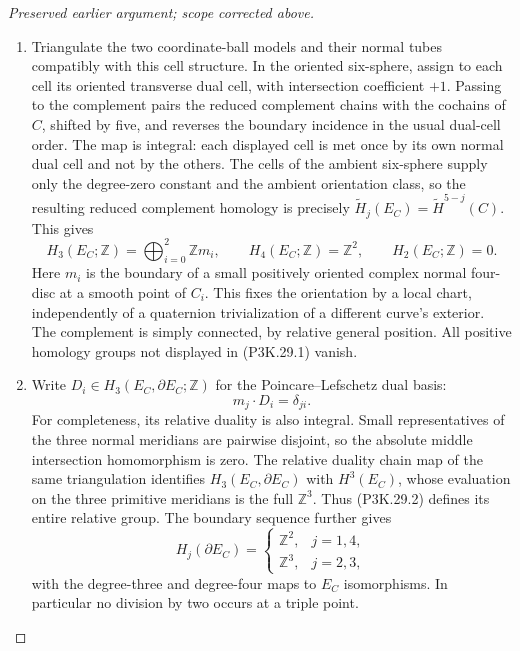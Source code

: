\begin{proof}[Preserved earlier argument; scope corrected above]
\begin{enumerate}[label=\arabic*.]
\item Triangulate the two coordinate-ball models and their
normal tubes compatibly with this cell structure.
In the oriented six-sphere, assign to each cell its
oriented transverse dual cell, with intersection
coefficient \(+1\). Passing to the complement pairs the
reduced complement chains with the cochains of \(C\),
shifted by five, and reverses the boundary incidence
in the usual dual-cell order. The map is integral:
each displayed cell is met once by its own normal
dual cell and not by the others. The cells of the
ambient six-sphere supply only the degree-zero
constant and the ambient orientation class, so the
resulting reduced complement homology is precisely
\(\widetilde H_j(E_C)=\widetilde H^{5-j}(C)\).
This gives
\[
 H_3(E_C;\mathbb Z)=\bigoplus_{i=0}^2\mathbb Z m_i,\qquad
 H_4(E_C;\mathbb Z)=\mathbb Z^2,\qquad H_2(E_C;\mathbb Z)=0.
                                                        \tag{P3K.29.1}
\]
Here \(m_i\) is the boundary of a small positively oriented complex
normal four-disc at a smooth point of \(C_i\). This fixes the
orientation by a local chart, independently of a quaternion
trivialization of a different curve's exterior. The complement is
simply connected, by relative general position. All positive
homology groups not displayed in (P3K.29.1) vanish.

\item Write \(D_i\in H_3(E_C,\partial E_C;\mathbb Z)\) for the
Poincare--Lefschetz dual basis:
\[
                    m_j\cdot D_i=\delta_{ji}.
                                                        \tag{P3K.29.2}
\]
For completeness, its relative duality is also integral.
Small representatives of the three normal meridians
are pairwise disjoint, so the absolute middle
intersection homomorphism is zero. The relative
duality chain map of the same triangulation identifies
\(H_3(E_C,\partial E_C)\) with \(H^3(E_C)\), whose
evaluation on the three primitive meridians is the
full \(\mathbb Z^3\). Thus (P3K.29.2) defines its entire
relative group. The boundary sequence further gives
\[
 H_j(\partial E_C)=
 \begin{cases}
  \mathbb Z^2,&j=1,4,\\
  \mathbb Z^3,&j=2,3,
 \end{cases}
\]
with the degree-three and degree-four maps to \(E_C\)
isomorphisms. In particular no division by two occurs
at a triple point.


\end{enumerate}
\end{proof}
